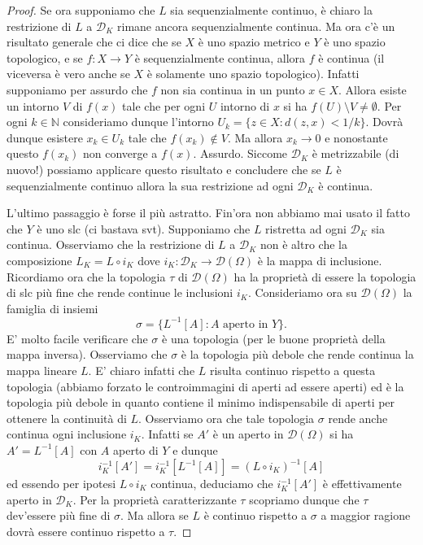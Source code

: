\documentclass[italian,a4paper,oneside,headinclude]{scrbook}
\newcommand{\D}{\mathcal D}
\newcommand{\NN}{\mathbb N}
\begin{document}
\begin{proof}
  Se ora supponiamo che $L$ sia sequenzialmente continuo, è chiaro la
  restrizione di $L$ a $\D_K$ rimane ancora sequenzialmente
  continua. Ma ora c'è un risultato generale che ci dice che se $X$ è
  uno spazio metrico e $Y$ è uno spazio topologico, e se
  $f\colon X\to Y$ è sequenzialmente continua, allora $f$ è continua
  (il viceversa è vero anche se $X$ è solamente uno spazio
  topologico).
  Infatti supponiamo per assurdo che $f$ non sia continua in un punto
  $x\in X$. Allora esiste un intorno $V$ di $f(x)$ tale che per ogni
  $U$ intorno di $x$ si ha
  $f(U) \setminus V \neq \emptyset$.
  Per ogni $k\in \NN$ consideriamo dunque l'intorno
  $U_k = \{z\in X\colon d(z,x) < 1/k\}$. Dovrà dunque esistere
  $x_k\in U_k$ tale che $f(x_k)\not \in V$. Ma allora $x_k\to 0$ e
  nonostante questo $f(x_k)$ non converge a $f(x)$. Assurdo.
  Siccome $\D_K$ è metrizzabile (di nuovo!) possiamo applicare questo
  risultato e concludere che se $L$ è sequenzialmente continuo allora
  la sua restrizione ad ogni $\D_K$ è continua.

  L'ultimo passaggio è forse il più astratto. Fin'ora non abbiamo mai
  usato il fatto che $Y$ è uno slc (ci bastava svt).
  Supponiamo che $L$ ristretta
  ad ogni $\D_K$ sia continua. Osserviamo che la restrizione di $L$ a
  $\D_K$ non è altro che la composizione $L_K = L\circ i_K$ dove
  $i_K\colon \D_K\to \D(\Omega)$ è la mappa di inclusione.
  Ricordiamo ora che la topologia $\tau$ di $\D(\Omega)$ ha la
  proprietà di essere la topologia di slc
  più fine che rende continue le
  inclusioni $i_K$. Consideriamo ora su $\D(\Omega)$ la famiglia di insiemi
  \[
  \sigma = \{L^{-1}[A]\colon \text{$A$ aperto in $Y$}\}.
  \]
  E' molto facile verificare che $\sigma$ è una topologia (per le
  buone proprietà della mappa inversa). Osserviamo
  che $\sigma$ è la topologia più debole che rende continua
  la mappa lineare $L$. E' chiaro infatti che $L$ risulta continuo
  rispetto a questa topologia (abbiamo forzato le
  controimmagini di aperti ad essere aperti) ed è la topologia più
  debole in quanto contiene il minimo indispensabile di aperti per
  ottenere la continuità di $L$.
  Osserviamo ora che tale topologia $\sigma$ rende anche continua ogni
  inclusione $i_K$. Infatti se $A'$ è un aperto in $\D(\Omega)$ si ha
  $A'=L^{-1}[A]$ con $A$ aperto di $Y$ e dunque
  \[
  i_K^{-1}[A'] = i_K^{-1}[L^{-1}[A]] = (L\circ i_K)^{-1}[A]
  \]
  ed essendo per ipotesi $L\circ i_K$ continua, deduciamo che
  $i_K^{-1}[A']$ è effettivamente aperto in $\D_K$.
  Per la proprietà caratterizzante $\tau$ scopriamo dunque che $\tau$
  dev'essere più fine di $\sigma$. Ma allora se $L$ è continuo
  rispetto a $\sigma$ a maggior ragione dovrà essere continuo rispetto
  a $\tau$.

\end{proof}
\end{document}
